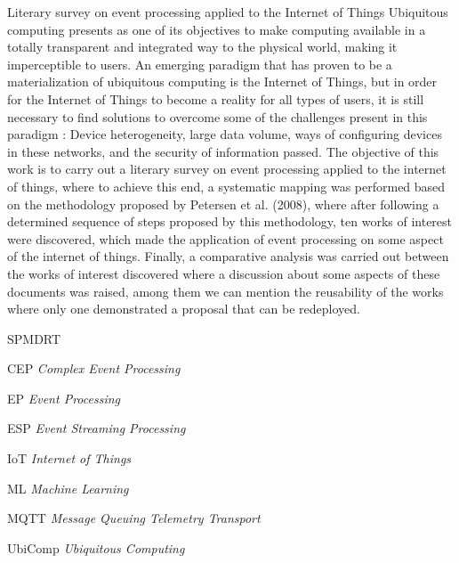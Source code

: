 \documentclass[ti,table]{texufpel} %
\begin{document}
\begin{englishabstract}%
{Literary survey on event processing applied to the Internet of Things} 
Ubiquitous computing presents as one of its objectives to make computing available in a totally transparent and integrated way to the physical world, making it imperceptible to users. An emerging paradigm that has proven to be a materialization of ubiquitous computing is the Internet of Things, but in order for the Internet of Things to become a reality for all types of users, it is still necessary to find solutions to overcome some of the challenges present in this paradigm : Device heterogeneity, large data volume, ways of configuring devices in these networks, and the security of information passed. The objective of this work is to carry out a literary survey on event processing applied to the internet of things, where to achieve this end, a systematic mapping was performed based on the methodology proposed by Petersen et al. (2008), where after following a determined sequence of steps proposed by this methodology, ten works of interest were discovered, which made the application of event processing on some aspect of the internet of things. Finally, a comparative analysis was carried out between the works of interest discovered where a discussion about some aspects of these documents was raised, among them we can mention the reusability of the works where only one demonstrated a proposal that can be redeployed. 

\end{englishabstract} 

  


\listoffigures 

  



  


\begin{listofabbrv}{SPMDRT} 

    \item[CEP] \textit{Complex Event Processing}   
    
    \item[EP] \textit{Event Processing} 
    
    \item[ESP] \textit{Event Streaming Processing} 
    
    \item[IoT] \textit{Internet of Things} 
    
    \item[ML] \textit{Machine Learning} 
    
    \item[MQTT] \textit{Message Queuing Telemetry Transport} 

    \item[UbiComp] \textit{Ubiquitous Computing} 
         

\end{listofabbrv} 
\end{document}
